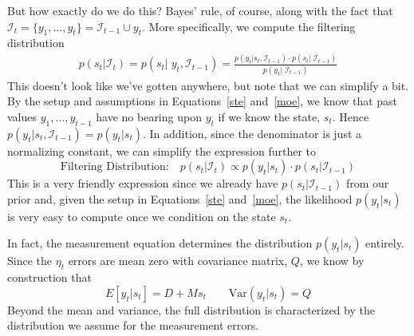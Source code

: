 \documentclass[a4paper,12pt]{article}
\begin{document}
But how exactly do we do this? Bayes' rule, of course, along with the fact that $\mathcal{I}_{t} = \{y_1, \ldots, y_t\}=\mathcal{I}_{t-1} \cup y_t$. More specifically, we compute the filtering distribution 
\begin{align*}
  p(s_t | \mathcal{I}_{t}) = 
  p(s_t | \; y_t, \mathcal{I}_{t-1}) = 
  \frac{p(y_t | s_t, \mathcal{I}_{t-1}) 
    \cdot p(s_t|\; \mathcal{I}_{t-1})
  }{p(y_t | \; \mathcal{I}_{t-1})}
\end{align*}
This doesn't look like we've gotten anywhere, but note that we can
simplify a bit. By the setup and assumptions in Equations~\ref{ste}
and~\ref{moe}, we know that past values $y_1, \ldots, y_{t-1}$ have no
bearing upon $y_t$ if we know the state, $s_t$. Hence $p(y_t|s_t,
\mathcal{I}_{t-1}) = p(y_t|s_t)$. In addition, since the denominator is
just a normalizing constant, we can simplify the expression further to  
\begin{equation}
  \label{filt}
  \text{Filtering Distribution:} \quad
  p(s_t | \mathcal{I}_{t}) \propto p(y_t | s_t) \cdot 
  p(s_t |\mathcal{I}_{t-1})
\end{equation}
This is a very friendly expression since we already have $p(s_t |
\mathcal{I}_{t-1})$ from our prior and, given the setup in
Equations~\ref{ste} and~\ref{moe}, the likelihood $p(y_t|s_t)$ is very
easy to compute once we condition on the state $s_t$.

In fact, the measurement equation determines the distribution
$p(y_t|s_t)$ entirely. Since the $\eta_t$ errors are mean zero with
covariance matrix, $Q$, we know by construction that
\[
  E[y_t|s_t] = D + M s_t 
  \qquad 
  \text{Var}(y_t|s_t) = Q
\]
Beyond the mean and variance, the full distribution is characterized by
the distribution we assume for the measurement errors.
\end{document}
